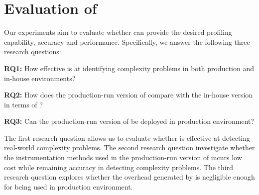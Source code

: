\section{Evaluation of \Tool}
\label{sec:eva}



Our experiments aim to evaluate whether \Tool 
can provide the desired profiling capability, accuracy and performance. 
Specifically, we answer the following three research questions:


\vspace*{3pt}
\noindent
 {\bf RQ1:} 
How effective is \Tool at identifying complexity problems
in both production and in-house environments?

\vspace*{3pt}
\noindent
{\bf RQ2:}
How does the production-run version of \Tool 
compare with the in-house version in terms of
?

\vspace*{3pt}
\noindent
{\bf RQ3:}
Can the production-run version of \Tool be deployed
in production environment?







\vspace*{2pt}


The first research question allows us to evaluate whether \Tool is effective 
at detecting real-world complexity problems. 
The second research question investigate whether the instrumentation methods 
used in the production-run version of \Tool incurs low cost while remaining
accuracy in detecting complexity problems. 
The third research question explores whether the overhead generated 
by \Tool is negligible enough for being used in production environment.



